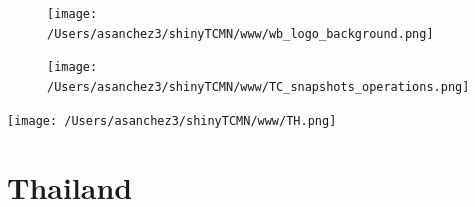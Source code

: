 \documentclass{article}\usepackage[]{graphicx}\usepackage[]{color}
\begin{document}
\newpage

\begin{figure}
  \vspace{-3ex} %
  \hspace{-7ex} %
  \texttt{[image: /Users/asanchez3/shinyTCMN/www/wb\_logo\_background.png]}
\end{figure}
\begin{figure}
  \begin{minipage}[t]{0.99\textwidth} %
      \vspace{-30ex}
      \hspace{-2ex}
      \raggedright{\texttt{[image: /Users/asanchez3/shinyTCMN/www/TC\_snapshots\_operations.png]}}
  \end{minipage}
\end{figure}

\begin{minipage}[t]{0.99\textwidth} %
  \vspace{-1.5cm}
  \begin{minipage}[c]{0.36\textwidth} 
    \begin{minipage}[c]{0.28\textwidth} %
      \texttt{[image: /Users/asanchez3/shinyTCMN/www/TH.png]}
    \end{minipage}
    \begin{minipage}[c]{0.70\textwidth} %
      \section*{\color{blue!40!black}Thailand}
    \end{minipage}
  \end{minipage}
  \begin{minipage}[c]{0.63\textwidth}
    \begin{flushleft}  
    \end{flushleft} 
  \end{minipage}  
\end{minipage} %
\end{document}

